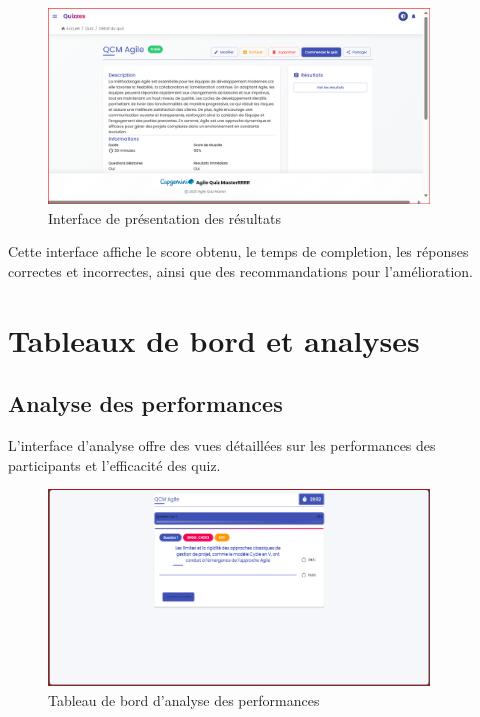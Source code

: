 \documentclass[12pt,a4paper]{report}
\begin{document}
\begin{figure}[H]
\centering
\includegraphics[width=0.9\textwidth]{latex_media/media/image60.png}
\caption{Interface de présentation des résultats}
\label{fig:resultats-quiz}
\end{figure}

Cette interface affiche le score obtenu, le temps de completion, les réponses correctes et incorrectes, ainsi que des recommandations pour l'amélioration.

\section{Tableaux de bord et analyses}

\subsection{Analyse des performances}

L'interface d'analyse offre des vues détaillées sur les performances des participants et l'efficacité des quiz.

\begin{figure}[H]
\centering
\includegraphics[width=0.9\textwidth]{latex_media/media/image61.png}
\caption{Tableau de bord d'analyse des performances}
\label{fig:analyse-performances}
\end{figure}
\end{document}
